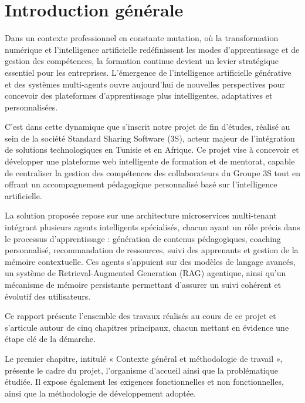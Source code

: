 \clearpage
\chapter*{Introduction générale}

Dans un contexte professionnel en constante mutation, où la transformation numérique et l'intelligence artificielle redéfinissent les modes d'apprentissage et de gestion des compétences, la formation continue devient un levier stratégique essentiel pour les entreprises. L'émergence de l'intelligence artificielle générative et des systèmes multi-agents ouvre aujourd'hui de nouvelles perspectives pour concevoir des plateformes d'apprentissage plus intelligentes, adaptatives et personnalisées.

C'est dans cette dynamique que s'inscrit notre projet de fin d'études, réalisé au sein de la société Standard Sharing Software (3S), acteur majeur de l'intégration de solutions technologiques en Tunisie et en Afrique. Ce projet vise à concevoir et développer une plateforme web intelligente de formation et de mentorat, capable de centraliser la gestion des compétences des collaborateurs du Groupe 3S tout en offrant un accompagnement pédagogique personnalisé basé sur l'intelligence artificielle.

La solution proposée repose sur une architecture microservices multi-tenant intégrant plusieurs agents intelligents spécialisés, chacun ayant un rôle précis dans le processus d'apprentissage : génération de contenus pédagogiques, coaching personnalisé, recommandation de ressources, suivi des apprenants et gestion de la mémoire contextuelle. Ces agents s'appuient sur des modèles de langage avancés, un système de Retrieval-Augmented Generation (RAG) agentique, ainsi qu'un mécanisme de mémoire persistante permettant d'assurer un suivi cohérent et évolutif des utilisateurs.

Ce rapport présente l'ensemble des travaux réalisés au cours de ce projet et s'articule autour de cinq chapitres principaux, chacun mettant en évidence une étape clé de la démarche.

Le premier chapitre, intitulé « Contexte général et méthodologie de travail », présente le cadre du projet, l'organisme d'accueil ainsi que la problématique étudiée. Il expose également les exigences fonctionnelles et non fonctionnelles, ainsi que la méthodologie de développement adoptée.

